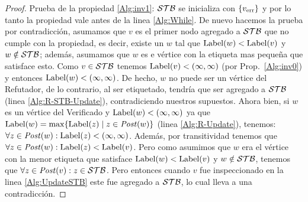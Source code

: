 \begin{proof}
Prueba de la propiedad \ref{Alg:inv1}: $\mathcal{STB}$ se inicializa con $\{v_{\text{err}} \}$ y por lo tanto la propiedad vale antes de la linea \ref{Alg:While}. 
De nuevo hacemos la prueba por contradicción, asumamos que $v$ es el primer nodo agregado a $\mathcal{STB}$ que no cumple con la propiedad, es decir, existe un $w$ tal que $\operatorname{Label}(w) < \operatorname{Label}(v)$ y
$w \notin \mathcal{STB}$; además, asumamos que $w$ es e vértice con la etiqueta mas pequeña que satisface esto. 
Como $v \in \mathcal{STB}$ tenemos $\operatorname{Label}(v)<(\infty, \infty)$ (por Prop.~\ref{Alg:inv0}) y entonces $\operatorname{Label}(w)< (\infty, \infty)$. 
De hecho, $w$ no puede ser un vértice del Refutador, de lo contrario, al ser etiquetado, tendría que ser agregado a $\mathcal{STB}$ (linea \ref{Alg:R-STB-Update}), 
contradiciendo nuestros supuestos. 
Ahora bien, si $w$ es un vértice del Verificado y $\operatorname{Label}(w) < (\infty, \infty)$
ya que $\operatorname{Label}(w) = \max\{\operatorname{Label}(z) \mid z \in \mathit{Post}(w)\}$ (linea \ref{Alg:R-Update}), tenemos: $\forall z \in \mathit{Post}(w) : \operatorname{Label}(z) < (\infty, \infty)$.
Además, por transitividad tenemos que $\forall z \in \mathit{Post}(w) : \operatorname{Label}(z) < \operatorname{Label}(v)$. Pero como asumimos que 
$w$ era el vértice con la menor etiqueta que satisface $\operatorname{Label}(w) < \operatorname{Label}(v)$ y $w \notin \mathcal{STB}$, tenemos que $\forall z \in \mathit{Post}(v) : z \in \mathcal{STB}$. Pero entonces cuando $v$ fue inspeccionado en la linea \ref{Alg:UpdateSTB} este fue agregado a $\mathcal{STB}$, 
lo cual lleva a una contradicción.


\end{proof}
